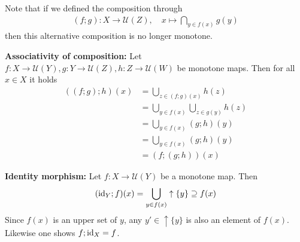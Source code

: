 Note that if we defined the composition through
\begin{align*}
  (f;g): X \to \mathcal{U}(Z),
  \quad
  x \mapsto \bigcap_{y \in f(x)} g(y)
\end{align*}
then this alternative composition is no longer monotone.


\textbf{Associativity of composition:} Let $f: X \to \mathcal{U}(Y), g: Y \to \mathcal{U}(Z), h: Z \to \mathcal{U}(W)$ be monotone maps. Then for all $x \in X$ it holds
\begin{align*}
  ((f;g);h)(x) 
  &=
  \bigcup_{z \in (f;g)(x)} h(z)
  \\
  &= \bigcup_{y \in f(x)}
  \bigcup_{z \in g(y)}
  h(z)
  \\
  &=
  \bigcup_{y \in f(x)}
  (g;h)(y)
  \\
  &=
  \bigcup_{y \in f(x)}
  (g;h)(y)
  \\
  &=(f;(g;h))(x)
\end{align*}

\textbf{Identity morphism:} Let $f: X \to \mathcal{U}(Y)$ be a monotone map. Then
\begin{align*}
  (\operatorname{id}_Y;f)(x) = \bigcup_{y \in f(x)} \uparrow\{y\} \supseteq f(x)
\end{align*}
Since $f(x)$ is an upper set of $y$, any $y' \in \uparrow\{y\}$ is also an element of $f(x)$.
Likewise one shows $f;\operatorname{id}_X = f$.
